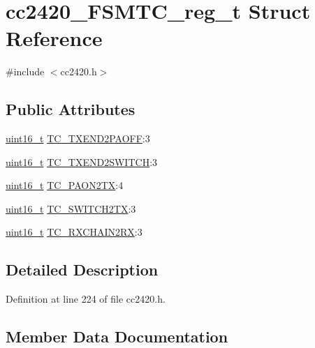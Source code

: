\hypertarget{structcc2420___f_s_m_t_c__reg__t}{}\section{cc2420\+\_\+\+F\+S\+M\+T\+C\+\_\+reg\+\_\+t Struct Reference}
\label{structcc2420___f_s_m_t_c__reg__t}


{\ttfamily \#include $<$cc2420.\+h$>$}

\subsection*{Public Attributes}
\begin{DoxyCompactItemize}
\item 
\hyperlink{_p_e___types_8h_a1f1825b69244eb3ad2c7165ddc99c956}{uint16\+\_\+t} \hyperlink{structcc2420___f_s_m_t_c__reg__t_a922ada08a2a954d3a196480cc9f4fd15}{T\+C\+\_\+\+T\+X\+E\+N\+D2\+P\+A\+O\+FF}\+:3
\item 
\hyperlink{_p_e___types_8h_a1f1825b69244eb3ad2c7165ddc99c956}{uint16\+\_\+t} \hyperlink{structcc2420___f_s_m_t_c__reg__t_a217fc07bc5883779788350828cd19863}{T\+C\+\_\+\+T\+X\+E\+N\+D2\+S\+W\+I\+T\+CH}\+:3
\item 
\hyperlink{_p_e___types_8h_a1f1825b69244eb3ad2c7165ddc99c956}{uint16\+\_\+t} \hyperlink{structcc2420___f_s_m_t_c__reg__t_ae64a1c3bbd928b074ebe366df36182e5}{T\+C\+\_\+\+P\+A\+O\+N2\+TX}\+:4
\item 
\hyperlink{_p_e___types_8h_a1f1825b69244eb3ad2c7165ddc99c956}{uint16\+\_\+t} \hyperlink{structcc2420___f_s_m_t_c__reg__t_ade4ce3d589eb827c2de8ade5b7556e23}{T\+C\+\_\+\+S\+W\+I\+T\+C\+H2\+TX}\+:3
\item 
\hyperlink{_p_e___types_8h_a1f1825b69244eb3ad2c7165ddc99c956}{uint16\+\_\+t} \hyperlink{structcc2420___f_s_m_t_c__reg__t_a748f8ce4e525a402d91e97260c67a2ae}{T\+C\+\_\+\+R\+X\+C\+H\+A\+I\+N2\+RX}\+:3
\end{DoxyCompactItemize}


\subsection{Detailed Description}


Definition at line 224 of file cc2420.\+h.



\subsection{Member Data Documentation}

